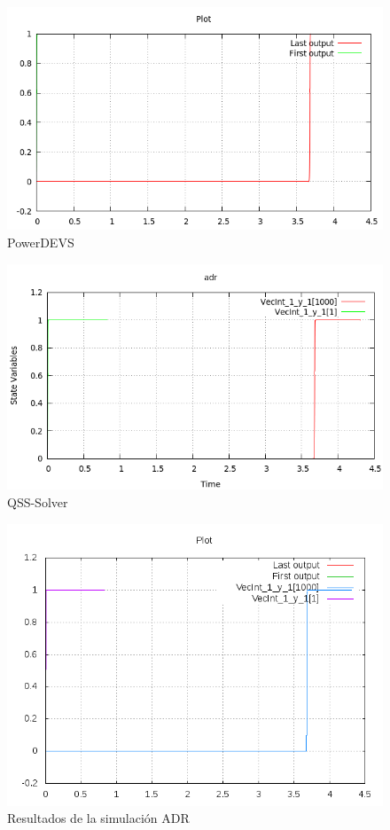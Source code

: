 \begin{figure}[H]
\begin{minipage}{0.5\textwidth}
 \includegraphics[width=\linewidth]{adr-pd}
\centering
PowerDEVS
\end{minipage}\hfill
\begin{minipage}{0.5\textwidth}
 \includegraphics[width=\linewidth]{adr-qss}
\centering
QSS-Solver
\end{minipage}
\includegraphics[width=\linewidth]{output/adr/adr-all}
\caption{Resultados de la simulación ADR}\label{graph:adr}
\end{figure}

